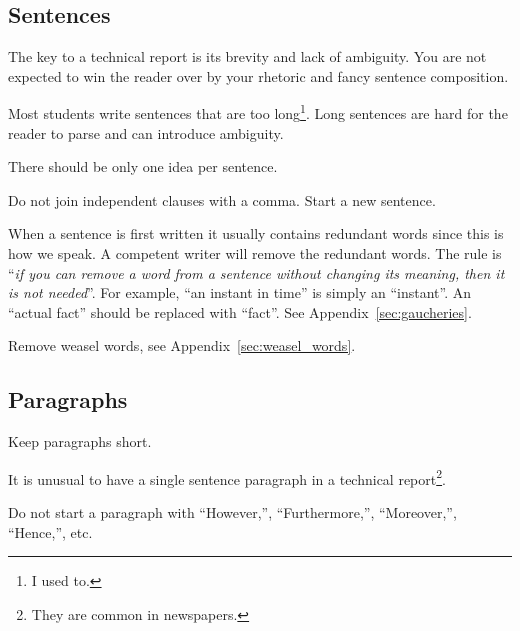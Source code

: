 \documentclass[a4paper,12pt]{article}
\newcommand{\refapp}[1]{\mbox{Appendix~\ref{sec:#1}}}
\newcounter{foo}
\newcounter{bar}
\begin{document}
\subsection{Sentences}
\label{sec:sentences}

The key to a technical report is its brevity and lack of ambiguity.
You are not expected to win the reader over by your rhetoric and fancy
sentence composition.

\begin{list}{W-}{}
\setcounter{foo}{\value{bar}}
\item Most students write sentences that are too long\footnote{I used
  to.}.  Long sentences are hard for the reader to parse and can
  introduce ambiguity.  

\item There should be only one idea per sentence.

\item Do not join independent clauses with a comma.  Start a new
  sentence.

\item When a sentence is first written it usually contains redundant
  words since this is how we speak.  A competent writer will remove
  the redundant words.  The rule is ``\emph{if you can remove a word
    from a sentence without changing its meaning, then it is not
    needed}''.  For example, ``an instant in time'' is simply an
  ``instant''.  An ``actual fact'' should be replaced with ``fact''.
  See \refapp{gaucheries}.


\item Remove weasel words, see \refapp{weasel_words}.

\setcounter{bar}{\value{foo}}
\end{list}


\subsection{Paragraphs}
\label{sec:paragraphs}

\begin{list}{W-}{}
\setcounter{foo}{\value{bar}}
\item Keep paragraphs short.

\item It is unusual to have a single sentence paragraph in a technical
  report\footnote{They are common in newspapers.}.

\item Do not start a paragraph with ``However,'', ``Furthermore,'',
  ``Moreover,'', ``Hence,'', etc.

\setcounter{bar}{\value{foo}}
\end{list}
\end{document}
